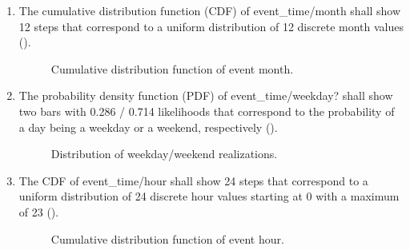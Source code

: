 \begin{enumerate}
    \item The cumulative distribution function (CDF) of event\_time/month shall show 12 steps that correspond to a uniform distribution of 12 discrete month values ().
    
\begin{figure}[!htbp]
  \caption{Cumulative distribution function of event month.}
  \label{fig:ver_1_1}
\end{figure}

    \item The probability density function (PDF) of event\_time/weekday? shall show two bars with 0.286 / 0.714 likelihoods that correspond to the probability of a day being a weekday or a weekend, respectively ().
    
\begin{figure}[!htbp]
  \caption{Distribution of weekday/weekend realizations.}
  \label{fig:ver_1_2}
\end{figure}    
    
    \item The CDF of event\_time/hour shall show 24 steps that correspond to a uniform distribution of 24 discrete hour values starting at 0 with a maximum of 23 ().
    
\begin{figure}[!htbp]
  \caption{Cumulative distribution function of event hour.}
  \label{fig:ver_1_3}
\end{figure}


\end{enumerate}

